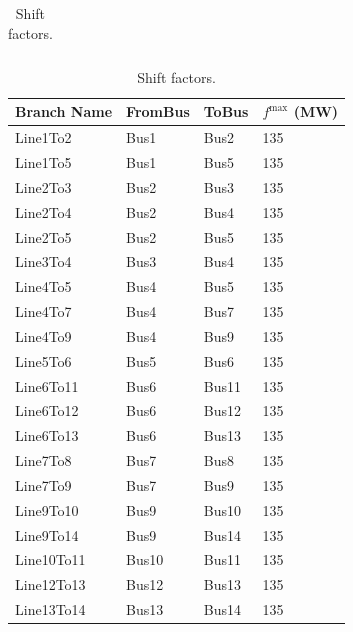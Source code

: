 \documentclass[12pt,x11names]{article}
\theoremstyle{definition}
\begin{document}
\begin{appendix}
\begin{landscape}
\begin{table}[h]
\begin{minipage}[t]{.25\linewidth}
{\begin{tabular}{|l|lllll|}
\hline
\end{tabular}}
\end{minipage}
\hfill
\begin{minipage}[t]{.2\linewidth}
\centering
{}
\label{tbl:line data}
		\resizebox*{1\textwidth}{!}
		{
			\begin{tabular}{|l|lll|}
				\hline
				Branch Name & FromBus & ToBus & $f^{\text{max}}$ (MW) \\
				\hline
				Line1To2    & Bus1    & Bus2  & 135           \\
				Line1To5    & Bus1    & Bus5  & 135           \\
				Line2To3    & Bus2    & Bus3  & 135           \\
				Line2To4    & Bus2    & Bus4  & 135           \\
				Line2To5    & Bus2    & Bus5  & 135           \\
				Line3To4    & Bus3    & Bus4  & 135           \\
				Line4To5    & Bus4    & Bus5  & 135           \\
				Line4To7    & Bus4    & Bus7  & 135           \\
				Line4To9    & Bus4    & Bus9  & 135           \\
				Line5To6    & Bus5    & Bus6  & 135           \\
				Line6To11   & Bus6    & Bus11 & 135           \\
				Line6To12   & Bus6    & Bus12 & 135           \\
				Line6To13   & Bus6    & Bus13 & 135           \\
				Line7To8    & Bus7    & Bus8  & 135           \\
				Line7To9    & Bus7    & Bus9  & 135           \\
				Line9To10   & Bus9    & Bus10 & 135           \\
				Line9To14   & Bus9    & Bus14 & 135           \\
				Line10To11  & Bus10   & Bus11 & 135           \\
				Line12To13  & Bus12   & Bus13 & 135           \\
				Line13To14  & Bus13   & Bus14 & 135          \\
				\hline
		\end{tabular}}
\end{minipage}
\hfill
\begin{minipage}[t]{.525\linewidth}
\caption{Shift factors.}
\label{tbl:ShiftFactors}

\end{minipage}
\end{table}
\end{landscape}
\end{appendix}
\end{document}
